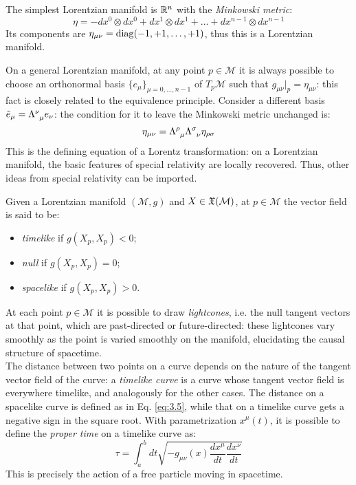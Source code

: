 \begin{example}
  The simplest Lorentzian manifold is $ \mathbb{R}^n $ with the \textit{Minkowski metric}:
  \begin{equation}
    \eta = - dx^0 \otimes dx^0 + dx^1 \otimes dx^1 + \dots + dx^{n-1} \otimes dx^{n-1}
    \label{eq:3.7}
  \end{equation}
  Its components are $ \eta_{\mu \nu} = \operatorname{diag} (-1,+1,\dots,+1) $, thus this is a Lorentzian manifold.
\end{example}

On a general Lorentzian manifold, at any point $ p \in \mathcal{M} $ it is always possible to choose an orthonormal basis $ \{e_{\mu}\}_{\mu = 0,\dots,n-1} $ of $ T_p \mathcal{M} $ such that $ g_{\mu \nu} \vert_p = \eta_{\mu \nu} $: this fact is closely related to the equivalence principle. Consider a different basis $ \tilde{e}_{\mu} = \tensor{\Lambda}{^\nu _\mu} e_{\nu} $: the condition for it to leave the Minkowski metric unchanged is:
\begin{equation}
  \eta_{\mu \nu} = \tensor{\Lambda}{^\rho _\mu} \tensor{\Lambda}{^\sigma _\nu} \eta_{\rho \sigma}
  \label{eq:3.8}
\end{equation}
This is the defining equation of a Lorentz transformation: on a Lorentzian manifold, the basic features of special relativity are locally recovered. Thus, other ideas from special relativity can be imported.

\begin{definition}
  Given a Lorentzian manifold $ (\mathcal{M},g) $ and $ X \in \mathfrak{X}(\mathcal{M}) $, at $ p \in \mathcal{M} $ the vector field is said to be:
  \begin{itemize}
    \item \textit{timelike} if $ g(X_p,X_p) < 0 $;
    \item \textit{null} if $ g(X_p,X_p) = 0 $;
    \item \textit{spacelike} if $ g(X_p,X_p) > 0 $.
  \end{itemize}
\end{definition}

At each point $ p \in \mathcal{M} $ it is possible to draw \textit{lightcones}, i.e. the null tangent vectors at that point, which are past-directed or future-directed: these lightcones vary smoothly as the point is varied smoothly on the manifold, elucidating the causal structure of spacetime.\\
The distance between two points on a curve depends on the nature of the tangent vector field of the curve: a \textit{timelike curve} is a curve whose tangent vector field is everywhere timelike, and analogously for the other cases. The distance on a spacelike curve is defined as in Eq. \ref{eq:3.5}, while that on a timelike curve gets a negative sign in the square root. With parametrization $ x^{\mu}(t) $, it is possible to define the \textit{proper time} on a timelike curve as:
\begin{equation}
  \tau = \int_a^b dt \sqrt{- g_{\mu \nu}(x) \frac{dx^{\mu}}{dt} \frac{dx^{\nu}}{dt}}
  \label{eq:3.9}
\end{equation}
This is precisely the action of a free particle moving in spacetime.


